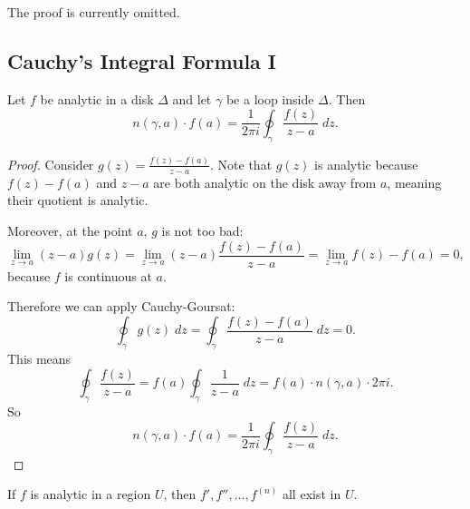 \documentclass[notes]{subfile}
\begin{document}
The proof is currently omitted.

\subsection{Cauchy's Integral Formula I}
\begin{theorem}
    Let $f$ be analytic in a disk $\Delta$ and let $\gamma$ be a loop inside $\Delta$.
    Then
    \[ n(\gamma, a) \cdot f(a) = \frac{1}{2\pi i} \oint_{\gamma} 
    \frac{f(z)}{z-a} \; dz. \]
\end{theorem}

\begin{proof}
    Consider $g(z) = \frac{f(z) - f(a)}{z - a}$.
    Note that $g(z)$ is analytic because $f(z) - f(a)$ and $z-a$ are both analytic on the disk away from $a$, meaning their quotient is analytic.

    Moreover, at the point $a$, $g$ is not too bad:
    \[ \lim_{z \to a} (z-a) g(z) = \lim_{z \to a} (z-a) \frac{f(z) - f(a)}{z - a} = \lim_{z \to a} f(z) - f(a) = 0, \]
    because $f$ is continuous at $a$.

    Therefore we can apply Cauchy-Goursat:
    \[ \oint_{\gamma} g(z) \; dz = \oint_{\gamma} \frac{f(z) - f(a)}{z - a} \; dz = 0. \]
    This means
    \[ \oint_{\gamma} \frac{f(z)}{z - a} = f(a) \oint_{\gamma} \frac{1}{z-a} \; dz = f(a) \cdot n(\gamma, a) \cdot 2\pi i. \]
    So
    \[ n(\gamma, a) \cdot f(a) = \frac{1}{2\pi i} \oint_{\gamma} 
    \frac{f(z)}{z-a} \; dz. \]
\end{proof}

\begin{cor}
    If $f$ is analytic in a region $U$, then
    $f', f'', \ldots, f^{(n)}$ all exist in $U$.
\end{cor}
\end{document}
